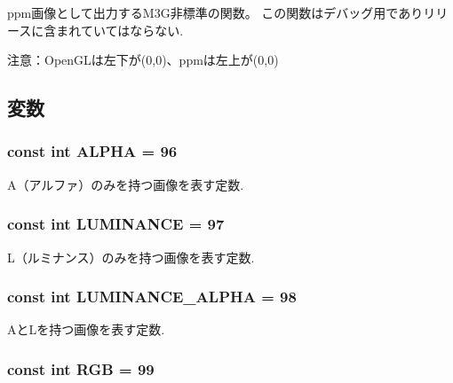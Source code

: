 ppm画像として出力するM3G非標準の関数。 この関数はデバッグ用でありリリースに含まれていてはならない.

注意：OpenGLは左下が(0,0)、ppmは左上が(0,0) 

\subsection{変数}
\hypertarget{classm3g_1_1Image2D_417581fcde4067111f47320edb2aa378}{
\subsubsection[{ALPHA}]{\setlength{\rightskip}{0pt plus 5cm}const int {\bf ALPHA} = 96}}
\label{classm3g_1_1Image2D_417581fcde4067111f47320edb2aa378}


A（アルファ）のみを持つ画像を表す定数. \hypertarget{classm3g_1_1Image2D_3cf02f5117269e8ff112cbf5ecb790cd}{
\subsubsection[{LUMINANCE}]{\setlength{\rightskip}{0pt plus 5cm}const int {\bf LUMINANCE} = 97}}
\label{classm3g_1_1Image2D_3cf02f5117269e8ff112cbf5ecb790cd}


L（ルミナンス）のみを持つ画像を表す定数. \hypertarget{classm3g_1_1Image2D_1a74b878039f244c27120cacb4eb6a3e}{
\subsubsection[{LUMINANCE\_\-ALPHA}]{\setlength{\rightskip}{0pt plus 5cm}const int {\bf LUMINANCE\_\-ALPHA} = 98}}
\label{classm3g_1_1Image2D_1a74b878039f244c27120cacb4eb6a3e}


AとLを持つ画像を表す定数. \hypertarget{classm3g_1_1Image2D_5f237f1b0f2ce6351e9e4a494b8dc759}{
\subsubsection[{RGB}]{\setlength{\rightskip}{0pt plus 5cm}const int {\bf RGB} = 99}}
\label{classm3g_1_1Image2D_5f237f1b0f2ce6351e9e4a494b8dc759}


